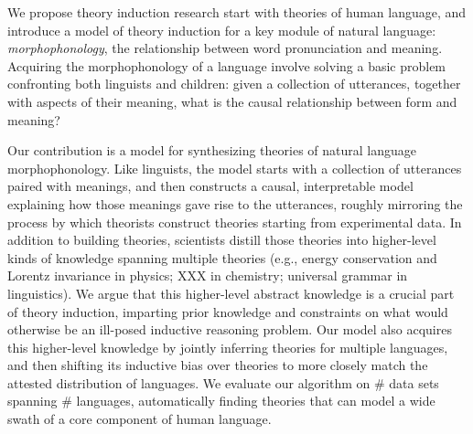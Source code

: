 \documentclass[12pt]{article}
\begin{document}
We propose theory induction research start with theories of human
language, and introduce a model of theory induction for a
key module of natural language: \emph{morphophonology}, the
relationship between word pronunciation and meaning.
Acquiring the morphophonology of a language involve solving a basic
problem confronting both linguists and children: given a collection
of utterances, together with aspects of their meaning, what is the
causal relationship between form and meaning?

Our contribution is a model for synthesizing theories of natural
language morphophonology.  Like linguists, the model starts with a
collection of utterances paired with meanings, and then constructs a
causal, interpretable model explaining how those meanings gave rise to
the utterances, roughly mirroring the process by which theorists
construct theories starting from experimental data.  In addition to
building theories, scientists distill those theories into higher-level
kinds of knowledge spanning multiple theories (e.g., energy
conservation and Lorentz invariance in physics; XXX in chemistry;
universal grammar in linguistics).  We argue that this higher-level
abstract knowledge is a crucial part of theory induction, imparting
prior knowledge and constraints on what would otherwise be an
ill-posed inductive reasoning problem.  Our model also acquires this
higher-level knowledge by jointly inferring theories for multiple
languages, and then shifting its inductive bias over theories to more
closely match the attested distribution of languages.  We evaluate our
algorithm on \# data sets spanning \# languages, automatically finding
theories that can model a wide swath of a core component of human
language.
\end{document}
